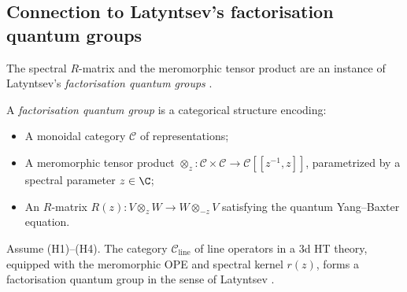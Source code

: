 \subsection{Connection to Latyntsev's factorisation quantum groups}

The spectral $R$-matrix and the meromorphic tensor product are an instance of Latyntsev's \emph{factorisation quantum groups} \cite{Lat23}.

\begin{definition}
A \emph{factorisation quantum group} is a categorical structure encoding:
\begin{itemize}
\item A monoidal category $\mathcal{C}$ of representations;
\item A meromorphic tensor product $\otimes_z : \mathcal{C} \times \mathcal{C} \to \mathcal{C}[[z^{-1}, z]]$, parametrized by a spectral parameter $z \in \C$;
\item An $R$-matrix $R(z) : V \otimes_z W \to W \otimes_{-z} V$ satisfying the quantum Yang--Baxter equation.
\end{itemize}
\end{definition}

\begin{theorem}
Assume \textrm{(H1)--(H4)}.
The category $\mathcal{C}_{\text{line}}$ of line operators in a 3d HT theory, equipped with the meromorphic OPE and spectral kernel $r(z)$, forms a factorisation quantum group in the sense of Latyntsev \cite{Lat23}.
\end{theorem}

